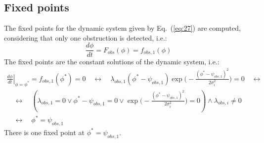 \subsection{Fixed points}%
\label{sec:fixed-points-obs}
The fixed points for the dynamic system given by Eq.~(\ref{eq:27}) are computed,
considering that only one obstruction is detected, i.e.:
\begin{equation}
  \label{eq:28}
 \frac{d \phi}{dt} = F_{obs}(\phi) = f_{obs,1}(\phi)
\end{equation}
%
The fixed points are the constant solutions of the dynamic system, i.e.:
\begin{equation}
  \label{eq:29}
\begin{array}{ll}
  \left. \frac{d \phi}{dt}\right|_{\phi = \phi^*} = f_{obs, 1}(\phi^*) = 0 
\quad \leftrightarrow \quad 
  \lambda_{obs,1} (\phi^* -\psi_{obs,1}) \exp \Big(-\frac{(\phi^* - \psi_{obs,1})^2}{2 \sigma_i ^2} \Big) = 0 
\quad \leftrightarrow \quad 
\\ 
\quad \leftrightarrow \quad (\lambda_{obs,1} = 0 \vee \phi^* - \psi_{obs,1} = 0 \vee  \exp \Big(-\frac{(\phi^* - \psi_{obs,1})^2}{2 \sigma_i ^2} \Big) = 0) \wedge \lambda_{obs,i} \ne 0
\\ 
\quad \leftrightarrow \quad 
\boxed{\phi^* = \psi_{obs,1}}
\end{array}
\end{equation}
There is one fixed point at $\phi^* = \psi_{obs,1}$.

